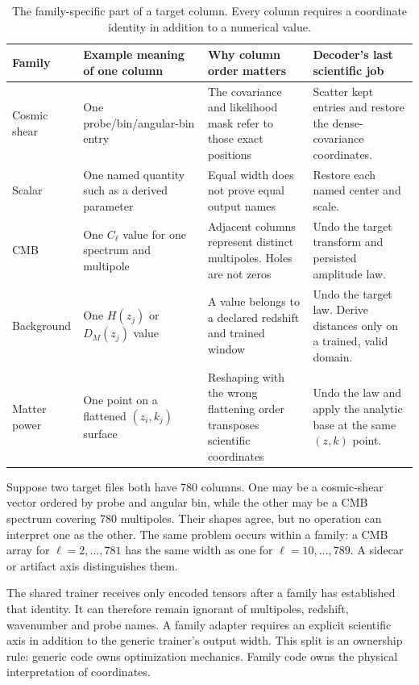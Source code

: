 \documentclass[10pt,aps,prd,twocolumn,nofootinbib]{revtex4-2}
\begin{document}
\begin{table}[t]
\centering
\begin{tabular}{p{}p{}p{}p{}}
\toprule
Family & Example meaning of one column & Why column order matters & Decoder's
last scientific job \\
\midrule
Cosmic shear & One probe/bin/angular-bin entry & The covariance and likelihood
mask refer to those exact positions & Scatter kept entries and restore the
dense-covariance coordinates.  \\
Scalar & One named quantity such as a derived parameter & Equal width does not
prove equal output names & Restore each named center and scale.  \\
CMB & One $C_\ell$ value for one spectrum and multipole & Adjacent columns
represent distinct multipoles.  Holes are not zeros & Undo the target transform
and persisted amplitude law.  \\
Background & One $H(z_j)$ or $D_M(z_j)$ value & A value belongs to a declared
redshift and trained window & Undo the target law.  Derive distances only on a
trained, valid domain.  \\
Matter power & One point on a flattened $(z_i,k_j)$ surface & Reshaping with
the wrong flattening order transposes scientific coordinates & Undo the law
and apply the analytic base at the same $(z,k)$ point.  \\
\bottomrule
\end{tabular}
\caption{The family-specific part of a target column.  Every column requires a
coordinate identity in addition to a numerical value.}
\end{table}

Suppose two target files both have 780 columns.  One may be a cosmic-shear
vector ordered by probe and angular bin, while the other may be a CMB spectrum
covering 780 multipoles.  Their shapes agree, but no operation can interpret
one as the other.  The same problem occurs within a family: a CMB array for
$\ell=2,\ldots,781$ has the same width as one for
$\ell=10,\ldots,789$.  A sidecar or artifact axis distinguishes them.

The shared trainer receives only encoded tensors after a family has established
that identity.  It can therefore remain ignorant of multipoles, redshift,
wavenumber and probe names.  A family adapter requires an explicit scientific
axis in addition to the generic trainer's output width.  This split is an
ownership rule: generic code owns optimization mechanics.  Family code
owns the physical interpretation of coordinates.
\end{document}
